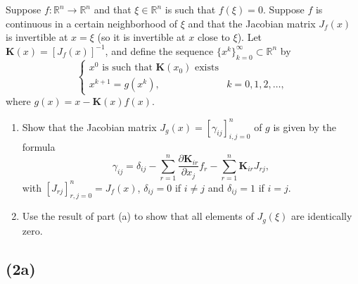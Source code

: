 \documentclass{article}
\begin{document}
\section{}
Suppose $f: \mathbb{R}^n \to \mathbb{R}^n$ and that $\xi \in \mathbb{R}^n$ is such that $f(\xi )=0$. Suppose $f$ is continuous in a certain neighborhood of $\xi$ and that the Jacobian matrix $J_f(x)$ is invertible at $x=\xi$ (so it is invertible at $x$ close to $\xi$). Let $\textbf{K}(x)=[J_f(x)]^{-1}$, and define the sequence $\bigg\{x^k \bigg\}_{k=0}^{\infty} \subset \mathbb{R}^n$ by
\begin{equation*}
    \begin{cases}
    x^0 \text{ is such that }\textbf{K}(x_0) \text{ exists}\\
    x^{k+1}=g(x^k), & k=0,1,2,\dots ,
    \end{cases}
\end{equation*}
where $g(x) = x-\textbf{K}(x)f(x)$.
\begin{enumerate}[label = (\alph*)]
    \item Show that the Jacobian matrix $J_g(x)=[\gamma_{ij}]_{i,j=0}^n$ of $g$ is given by the formula
    \begin{equation*}
        \gamma_{ij} = \delta_{ij} - \sum_{r=1}^n \frac{\partial \textbf{K}_{ir}}{\partial x_j}f_r - \sum_{r=1}^n \textbf{K}_{ir}J_{rj},
    \end{equation*}
    with $[J_{rj}]_{r,j=0}^n = J_f(x)$, $\delta_{ij} = 0$ if $i \ne j$ and $\delta_{ij}=1$ if $i=j$.
    \item Use the result of part (a) to show that all elements of $J_g(\xi)$ are identically zero.
\end{enumerate}

\subsection*{(2a)}
\end{document}

